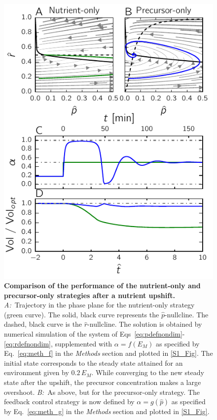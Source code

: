\begin{figure}[p]
\centering
\includegraphics[scale=1]{./Fig/Fig6}
\caption{\small
\textbf{Comparison of the performance of the nutrient-only and precursor-only strategies after a nutrient upshift.}
\textit{A:}~Trajectory in the phase plane for the nutrient-only strategy (green curve).
The solid, black curve represents the $\hat{p}$-nullcline.
The dashed, black curve is the $\hat{r}$-nullcline.
The solution is obtained by numerical simulation of the system of Eqs~\ref{eq:pdefnondim}-\ref{eq:rdefnondim}, supplemented with $\alpha = f(E_M)$ as specified by Eq.~\ref{eq:meth_f} in the \textit{Methods} section and plotted in \ref{S1_Fig}.
The initial state corresponds to the steady state attained for an environment given by $0.2 \, E_M$.
While converging to the new steady state after the upshift, the precursor concentration makes a large overshoot.
\textit{B:}~As above, but for the precursor-only strategy.
The feedback control strategy is now defined by $\alpha = g(\hat{p})$ as specified by Eq.~\ref{eq:meth_g} in the \textit{Methods} section and plotted in \ref{S1_Fig}.
}
\end{figure}
